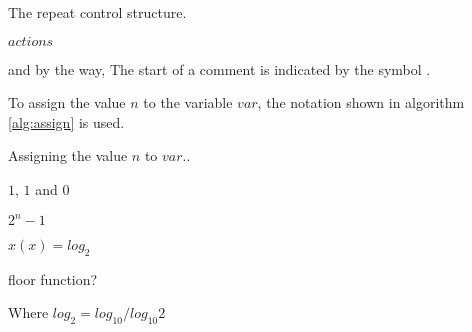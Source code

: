 \begin{algorithm}[H]
  \caption{The repeat control structure.}
  \label{alg:repeat}
  \begin{algorithmic}[1]
    \State $actions$ 
    \EndRepeatn
  \end{algorithmic}
\end{algorithm}

and by the way, The start of a comment is indicated by the symbol \commentsymbol.

To assign the value $n$ to the variable $var$, the notation shown in
algorithm \ref{alg:assign} is used.

\begin{algorithm}[H]
  \caption{Assigning the value $n$ to $var$..}
  \label{alg:assign}
  \begin{algorithmic}[1]
  \end{algorithmic}
\end{algorithm}

\begin{Answer}[ref={bits-value-order}]
  $1$, $1$ and $0$
\end{Answer}

\begin{Answer}[ref={n-bits-max-val}]
  $2^n - 1$
\end{Answer}

\begin{Answer}[ref={count-bits-func}]
  $x(x) = log_2$

  floor function?

  Where $log_2 = log_{10} / log_{10}2$
\end{Answer}